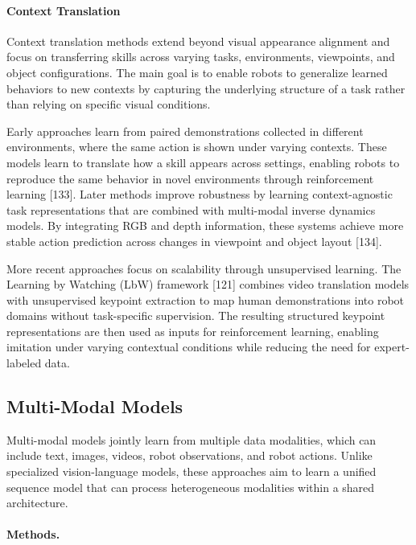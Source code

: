 \paragraph{Context Translation}
Context translation methods extend beyond visual appearance alignment and focus on transferring skills across varying tasks, environments, viewpoints, and object configurations. The main goal is to enable robots to generalize learned behaviors to new contexts by capturing the underlying structure of a task rather than relying on specific visual conditions.

Early approaches learn from paired demonstrations collected in different environments, where the same action is shown under varying contexts. These models learn to translate how a skill appears across settings, enabling robots to reproduce the same behavior in novel environments through reinforcement learning [133]. Later methods improve robustness by learning context-agnostic task representations that are combined with multi-modal inverse dynamics models. By integrating RGB and depth information, these systems achieve more stable action prediction across changes in viewpoint and object layout [134].

More recent approaches focus on scalability through unsupervised learning. The Learning by Watching (LbW) framework [121] combines video translation models with unsupervised keypoint extraction to map human demonstrations into robot domains without task-specific supervision. The resulting structured keypoint representations are then used as inputs for reinforcement learning, enabling imitation under varying contextual conditions while reducing the need for expert-labeled data.









\subsection{Multi-Modal Models}

Multi-modal models jointly learn from multiple data modalities, which can include text, images, videos, robot observations, and robot actions. 
Unlike specialized vision-language models, these approaches aim to learn a unified sequence model that can process heterogeneous modalities within a shared architecture.

\paragraph{Methods.}

